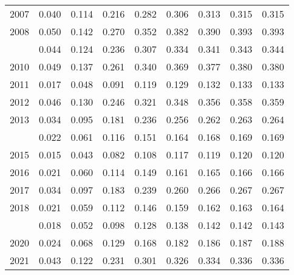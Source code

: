 \documentclass[
]{article}
\begin{document}
\begin{longtable}[t]{lrrrrrrrr}
2007 & 0.040 & 0.114 & 0.216 & 0.282 & 0.306 & 0.313 & 0.315 & 0.315\\
2008 & 0.050 & 0.142 & 0.270 & 0.352 & 0.382 & 0.390 & 0.393 & 0.393\\
\addlinespace
2009 & 0.044 & 0.124 & 0.236 & 0.307 & 0.334 & 0.341 & 0.343 & 0.344\\
2010 & 0.049 & 0.137 & 0.261 & 0.340 & 0.369 & 0.377 & 0.380 & 0.380\\
2011 & 0.017 & 0.048 & 0.091 & 0.119 & 0.129 & 0.132 & 0.133 & 0.133\\
2012 & 0.046 & 0.130 & 0.246 & 0.321 & 0.348 & 0.356 & 0.358 & 0.359\\
2013 & 0.034 & 0.095 & 0.181 & 0.236 & 0.256 & 0.262 & 0.263 & 0.264\\
\addlinespace
2014 & 0.022 & 0.061 & 0.116 & 0.151 & 0.164 & 0.168 & 0.169 & 0.169\\
2015 & 0.015 & 0.043 & 0.082 & 0.108 & 0.117 & 0.119 & 0.120 & 0.120\\
2016 & 0.021 & 0.060 & 0.114 & 0.149 & 0.161 & 0.165 & 0.166 & 0.166\\
2017 & 0.034 & 0.097 & 0.183 & 0.239 & 0.260 & 0.266 & 0.267 & 0.267\\
2018 & 0.021 & 0.059 & 0.112 & 0.146 & 0.159 & 0.162 & 0.163 & 0.164\\
\addlinespace
2019 & 0.018 & 0.052 & 0.098 & 0.128 & 0.138 & 0.142 & 0.142 & 0.143\\
2020 & 0.024 & 0.068 & 0.129 & 0.168 & 0.182 & 0.186 & 0.187 & 0.188\\
2021 & 0.043 & 0.122 & 0.231 & 0.301 & 0.326 & 0.334 & 0.336 & 0.336\\*
\end{longtable}
\end{document}
